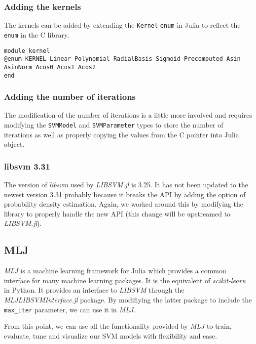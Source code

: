 \subsubsection{Adding the kernels}

The kernels can be added by extending the \texttt{Kernel} \texttt{enum} in Julia to reflect the
\texttt{enum} in the C library.
\begin{verbatim}
module kernel
@enum KERNEL Linear Polynomial RadialBasis Sigmoid Precomputed Asin AsinNorm Acos0 Acos1 Acos2
end
\end{verbatim}

\subsubsection{Adding the number of iterations}

The modification of the number of iterations is a little more involved and requires modifying the
\texttt{SVMModel} and \texttt{SVMParameter} types to store the number of iterations as well
as properly copying the values from the C pointer into Julia object.

\subsubsection{libsvm 3.31}

The version of \emph{libsvm} used by \emph{LIBSVM.jl} is 3.25. It has not been updated to the
newest version 3.31 probably because it breaks the API by adding the option of
probability density estimation. Again, we worked around this by modifying the library to properly
handle the new API (this change will be upstreamed to \emph{LIBSVM.jl}). %

\subsection{MLJ}

\emph{MLJ} \cite{blaomMLJJuliaPackage2020} is a machine learning framework for Julia which provides a common interface
for many machine learning packages. It is the equivalent of \emph{scikit-learn} in Python. It provides
an interface to \emph{LIBSVM} through the \emph{MLJLIBSVMInterface.jl} package. By modifiying the latter
package to include the \texttt{max\_iter} parameter, we can use it in \emph{MLJ}.

From this point, we can use all the functionality provided by \emph{MLJ} to train, evaluate,
tune and visualize our SVM models with flexibility and ease.

